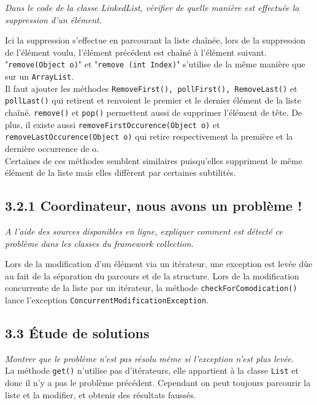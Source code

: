 \documentclass{article}
\begin{document}
\noindent \emph{Dans le code de la classe LinkedList, vérifier de quelle manière est effectuée la suppression d’un élément.}

Ici la suppression s'effectue en parcourant la liste chaînée, lors de la suppression de l'élément voulu, l'élément précédent est chaîné à l'élément suivant.\\
"\texttt{remove(Object o)}" et "\texttt{remove (int Index)}" s'utilise de la même manière que sur un \texttt{ArrayList}.\\
Il faut ajouter les méthodes \texttt{RemoveFirst(), pollFirst(), RemoveLast()} et \texttt{pollLast()} qui retirent et renvoient le premier et le dernier élément de la liste chaîné. \texttt{remove()} et \texttt{pop()} permettent aussi de supprimer l'élément de tête. De plus, il existe aussi \texttt{removeFirstOccurence(Object o)} et \texttt{removeLastOccurence(Object o)} qui retire respectivement la première et la dernière occurrence de o.\\
Certaines de ces méthodes semblent similaires puisqu'elles suppriment le même élément de la liste mais elles diffèrent par certaines subtilités.

\subsection*{3.2.1  Coordinateur, nous avons un problème !}

\noindent \emph{A l’aide des sources disponibles en ligne, expliquer comment est détecté ce problème dans les classes du framework collection.}

Lors de la modification d'un élément via un itérateur, une exception est levée d\^ue au fait de la séparation du parcours et de la structure. Lors de la modification concurrente de la liste par un itérateur, la méthode \texttt{checkForComodication()} lance l'exception \texttt{ConcurrentModificationException}. 

\subsection*{3.3  Étude de solutions}

\noindent \emph{Montrer que le problème n’est pas résolu même si l’exception n’est plus levée.}\\
La méthode \texttt{get()} n'utilise pas d'itérateurs, elle appartient à la classe \texttt{List} et donc il n'y a pas le problème précédent. Cependant on peut toujours parcourir la liste et la modifier, et obtenir des résultats faussés.\\
\end{document}
